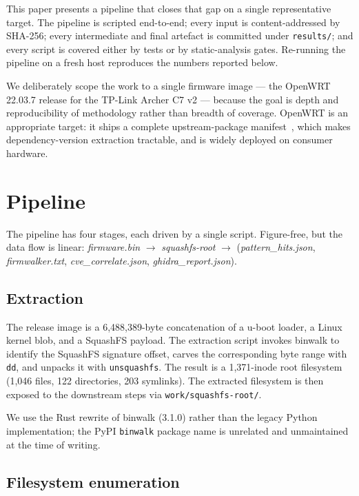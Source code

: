 \documentclass[conference]{IEEEtran}
\begin{document}
This paper presents a pipeline that closes that gap on a single
representative target. The pipeline is scripted end-to-end; every
input is content-addressed by SHA-256; every intermediate and final
artefact is committed under \texttt{results/}; and every script is
covered either by tests or by static-analysis gates. Re-running the
pipeline on a fresh host reproduces the numbers reported below.

We deliberately scope the work to a single firmware image — the
OpenWRT 22.03.7 release for the TP-Link Archer C7 v2 — because the
goal is depth and reproducibility of methodology rather than breadth
of coverage. OpenWRT is an appropriate target: it ships a complete
upstream-package manifest~\cite{openwrtOpkg}, which makes
dependency-version extraction tractable, and is widely deployed on
consumer hardware.

\section{Pipeline}

The pipeline has four stages, each driven by a single script.
Figure-free, but the data flow is linear:
\textit{firmware.bin} $\rightarrow$
\textit{squashfs-root} $\rightarrow$
(\textit{pattern\_hits.json}, \textit{firmwalker.txt},
\textit{cve\_correlate.json}, \textit{ghidra\_report.json}).

\subsection{Extraction}

The release image is a 6{,}488{,}389-byte concatenation of a u-boot
loader, a Linux kernel blob, and a SquashFS payload. The
extraction script invokes binwalk to identify the SquashFS signature
offset, carves the corresponding byte range with \texttt{dd}, and
unpacks it with \texttt{unsquashfs}. The result is a 1{,}371-inode
root filesystem (1{,}046 files, 122 directories, 203 symlinks). The
extracted filesystem is then exposed to the downstream steps via
\texttt{work/squashfs-root/}.

We use the Rust rewrite of binwalk (3.1.0) rather than the legacy
Python implementation; the PyPI \texttt{binwalk} package name is
unrelated and unmaintained at the time of writing.

\subsection{Filesystem enumeration}
\end{document}
